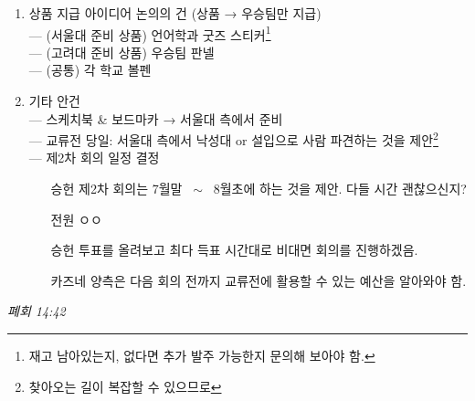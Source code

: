 \documentclass{oblivoir}
\begin{document}
\begin{enumerate}
    \\영상 2: 도정업 교수님 응원 영상 (서울대 담당)    
    \item 상품 지급 아이디어 논의의 건 (상품 → 우승팀만 지급)
    \\--- (서울대 준비 상품) 언어학과 굿즈 스티커\footnote{재고 남아있는지, 없다면 추가 발주 가능한지 문의해 보아야 함.}
    \\--- (고려대 준비 상품) 우승팀 판넬
    \\--- (공통) 각 학교 볼펜
    \item 기타 안건
    \\--- 스케치북 \& 보드마카 → 서울대 측에서 준비
    \\--- 교류전 당일: 서울대 측에서 낙성대 or 설입으로 사람 파견하는 것을 제안\footnote{찾아오는 길이 복잡할 수 있으므로}
    \\--- 제2차 회의 일정 결정
    \begin{itemize}
        \item [승헌] 제2차 회의는 7월말 ~$\sim$~ 8월초에 하는 것을 제안. 다들 시간 괜찮으신지?
        \item [전원] ㅇㅇ
        \item [승헌] 투표를 올려보고 최다 득표 시간대로 비대면 회의를 진행하겠음. 
        \item [카즈네] 양측은 다음 회의 전까지 교류전에 활용할 수 있는 예산을 알아와야 함.
    \end{itemize}
\end{enumerate}

\textit{폐회 14:42}
\end{document}
